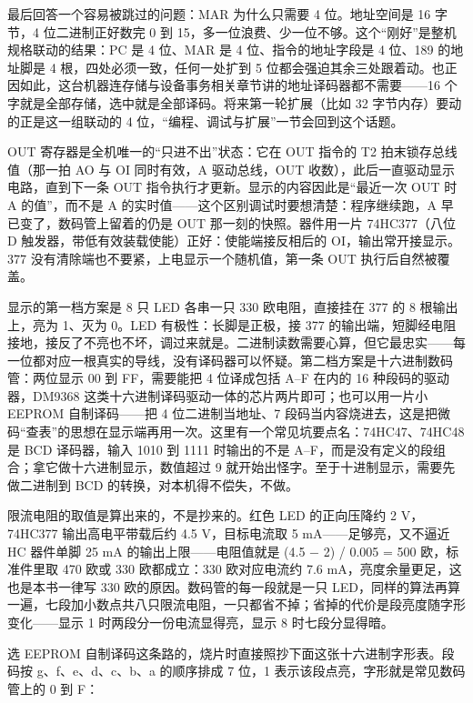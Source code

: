 最后回答一个容易被跳过的问题：MAR 为什么只需要 4 位。地址空间是 16 字节，4 位二进制正好数完 0 到 15，多一位浪费、少一位不够。这个“刚好”是整机规格联动的结果：PC 是 4 位、MAR 是 4 位、指令的地址字段是 4 位、189 的地址脚是 4 根，四处必须一致，任何一处扩到 5 位都会强迫其余三处跟着动。也正因如此，这台机器连存储与设备事务相关章节讲的地址译码器都不需要——16 个字就是全部存储，选中就是全部译码。将来第一轮扩展（比如 32 字节内存）要动的正是这一组联动的 4 位，“编程、调试与扩展”一节会回到这个话题。

OUT 寄存器是全机唯一的“只进不出”状态：它在 OUT 指令的 T2 拍末锁存总线值（那一拍 AO 与 OI 同时有效，A 驱动总线，OUT 收数），此后一直驱动显示电路，直到下一条 OUT 指令执行才更新。显示的内容因此是“最近一次 OUT 时 A 的值”，而不是 A 的实时值——这个区别调试时要想清楚：程序继续跑，A 早已变了，数码管上留着的仍是 OUT 那一刻的快照。器件用一片 74HC377（八位 D 触发器，带低有效装载使能）正好：使能端接反相后的 OI，输出常开接显示。377 没有清除端也不要紧，上电显示一个随机值，第一条 OUT 执行后自然被覆盖。

显示的第一档方案是 8 只 LED 各串一只 330 欧电阻，直接挂在 377 的 8 根输出上，亮为 1、灭为 0。LED 有极性：长脚是正极，接 377 的输出端，短脚经电阻接地，接反了不亮也不坏，调过来就是。二进制读数需要心算，但它最忠实——每一位都对应一根真实的导线，没有译码器可以怀疑。第二档方案是十六进制数码管：两位显示 00 到 FF，需要能把 4 位译成包括 A–F 在内的 16 种段码的驱动器，DM9368 这类十六进制译码驱动一体的芯片两片即可；也可以用一片小 EEPROM 自制译码——把 4 位二进制当地址、7 段码当内容烧进去，这是把微码“查表”的思想在显示端再用一次。这里有一个常见坑要点名：74HC47、74HC48 是 BCD 译码器，输入 1010 到 1111 时输出的不是 A–F，而是没有定义的段组合；拿它做十六进制显示，数值超过 9 就开始出怪字。至于十进制显示，需要先做二进制到 BCD 的转换，对本机得不偿失，不做。

限流电阻的取值是算出来的，不是抄来的。红色 LED 的正向压降约 2 V，74HC377 输出高电平带载后约 4.5 V，目标电流取 5 mA——足够亮，又不逼近 HC 器件单脚 25 mA 的输出上限——电阻值就是 (4.5 − 2) / 0.005 = 500 欧，标准件里取 470 欧或 330 欧都成立：330 欧对应电流约 7.6 mA，亮度余量更足，这也是本书一律写 330 欧的原因。数码管的每一段就是一只 LED，同样的算法再算一遍，七段加小数点共八只限流电阻，一只都省不掉；省掉的代价是段亮度随字形变化——显示 1 时两段分一份电流显得亮，显示 8 时七段分显得暗。

选 EEPROM 自制译码这条路的，烧片时直接照抄下面这张十六进制字形表。段码按 g、f、e、d、c、b、a 的顺序排成 7 位，1 表示该段点亮，字形就是常见数码管上的 0 到 F：

